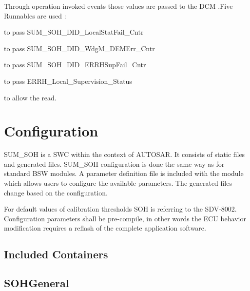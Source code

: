 Through operation invoked events those values are passed to the DCM .Five Runnables are used :

{
\textbf{} to pass  SUM\_SOH\_DID\_LocalStatFail\_Cntr
}
{
}

{
\textbf{} to pass  SUM\_SOH\_DID\_WdgM_DEMErr\_Cntr
}
{
}

{
\textbf{} to pass  SUM\_SOH\_DID\_ERRHSupFail\_Cntr
}
{
}

{
\textbf{} to pass  ERRH\_Local\_Supervision\_Status
}
{
}

{
\textbf{} to allow the read.
}
{
}

\section{Configuration}
\label{sec:Configuration}

{
SUM\_SOH is a SWC within the context of AUTOSAR.
It consists of static files and generated files.
SUM\_SOH configuration is done the same way as for standard BSW modules.
A parameter definition file is included with the module which allows users to configure the available parameters.
The generated files change based on the configuration.


For default values of calibration thresholds SOH is referring to the SDV-8002.
Configuration parameters shall be pre-compile, in other words the ECU behavior modification requires
a reflash of the complete application software.
}
{   }

\subsection{Included Containers}


\subsection{SOHGeneral}
\label{subsection:SOHGen}

